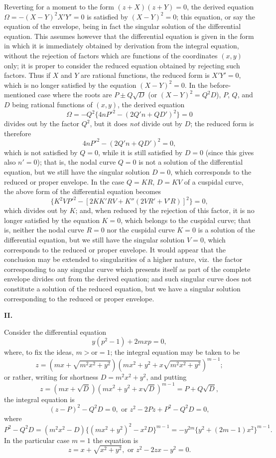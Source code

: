 \documentclass[11pt,a4paper]{article}
\begin{document}
Reverting for a moment to the form $(z+X)(z+Y)=0$, the derived equation $\Omega = -(X-Y)^2 X'Y' = 0$ is satisfied by $(X-Y)^2=0$; this equation, or say the equation of the envelope, being in fact the singular solution of the differential equation. This assumes however that the differential equation is given in the form in which it is immediately obtained by derivation from the integral equation, without the rejection of factors which are functions of the coordinates $(x,y)$ only; it is proper to consider the reduced equation obtained by rejecting such factors. Thus if $X$ and $Y$ are rational functions, the reduced form is $X'Y'=0$, which is no longer satisfied by the equation $(X-Y)^2=0$. In the before-mentioned case where the roots are $P \pm Q\sqrt{D}$ (or $(X-Y)^2 = Q^2 D$), $P$, $Q$, and $D$ being rational functions of $(x,y)$, the derived equation
\[
\Omega = -Q^2\{4nP'^2 - (2Q'n + QD')^2\} = 0
\]
divides out by the factor $Q^2$, but it does \emph{not} divide out by $D$; the reduced form is therefore
\[
4nP'^2 - (2Q'n + QD')^2 = 0,
\]
which is not satisfied by $Q=0$, while it is still satisfied by $D=0$ (since this gives also $n'=0$); that is, the nodal curve $Q=0$ is not a solution of the differential equation, but we still have the singular solution $D=0$, which corresponds to the reduced or proper envelope. In the case $Q=KR$, $D=KV$ of a cuspidal curve, the above form of the differential equation becomes
\[
\{K^2 V P'^2 - [2KK'RV + K''(2VR' + V'R)]^2\} = 0,
\]
which divides out by $K$; and, when reduced by the rejection of this factor, it is no longer satisfied by the equation $K=0$, which belongs to the cuspidal curve; that is, neither the nodal curve $R=0$ nor the cuspidal curve $K=0$ is a solution of the differential equation, but we still have the singular solution $V=0$, which corresponds to the reduced or proper envelope. It would appear that the conclusion may be extended to singularities of a higher nature, viz.\ the factor corresponding to any singular curve which presents itself as part of the complete envelope divides out from the derived equation; and such singular curve does not constitute a solution of the reduced equation, but we have a singular solution corresponding to the reduced or proper envelope.

\bigskip
\noindent \textbf{II.}

\medskip

\noindent Consider the differential equation
\[
y(p^2-1) + 2mxp = 0,
\]
where, to fix the ideas, $m > \text{or} = 1$; the integral equation may be taken to be
\[
z = (mx + \sqrt{m^2 x^2 + y^2})(mx^2 + y^2 + x\sqrt{m^2 x^2 + y^2})^{m-1};
\]
or rather, writing for shortness $D = m^2 x^2 + y^2$, and putting
\[
z = (mx + \sqrt{D})(mx^2 + y^2 + x\sqrt{D})^{m-1} = P + Q\sqrt{D},
\]
the integral equation is
\[
(z-P)^2 - Q^2 D = 0, \text{ or } z^2 - 2Pz + P^2 - Q^2 D = 0,
\]
where
\[
P^2 - Q^2 D = (m^2 x^2 - D)\{(mx^2 + y^2)^2 - x^2 D\}^{m-1} = -y^{2m}\{y^2 + (2m-1)x^2\}^{m-1}.
\]
In the particular case $m=1$ the equation is
\[
z = x + \sqrt{x^2+y^2}, \text{ or } z^2 - 2zx - y^2 = 0.
\]
\end{document}
